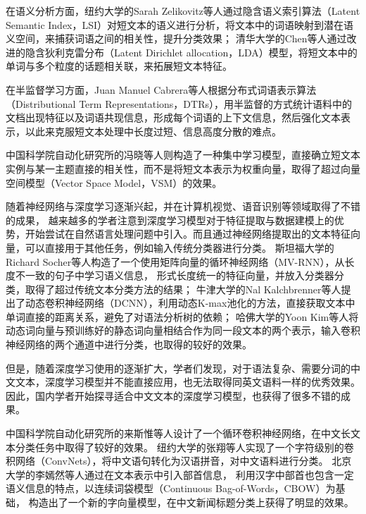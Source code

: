 在语义分析方面，纽约大学的Sarah Zelikovitz等人通过隐含语义索引算法（Latent Semantic Index，LSI）对短文本的语义进行分析，将文本中的词语映射到潜在语义空间，来捕获词语之间的相关性，提升分类效果；
清华大学的Chen等人通过改进的隐含狄利克雷分布（Latent Dirichlet allocation，LDA）模型，将短文本中的单词与多个粒度的话题相关联，来拓展短文本特征。

在半监督学习方面，Juan Manuel Cabrera等人根据分布式词语表示算法（Distributional Term Representations，DTRs），用半监督的方式统计语料中的文档出现特征以及词语共现信息，形成每个词语的上下文信息，然后强化文本表示，以此来克服短文本处理中长度过短、信息高度分散的难点。

中国科学院自动化研究所的冯晓等人则构造了一种集中学习模型，直接确立短文本实例与某一主题直接的相关性，而不是将短文本表示为权重向量，取得了超过向量空间模型（Vector Space Model，VSM）的效果。

随着神经网络与深度学习逐渐兴起，并在计算机视觉、语音识别等领域取得了不错的成果，
越来越多的学者注意到深度学习模型对于特征提取与数据建模上的优势，开始尝试在自然语言处理问题中引入。而且通过神经网络提取出的文本特征向量，可以直接用于其他任务，例如输入传统分类器进行分类。
斯坦福大学的Richard Socher等人构造了一个使用矩阵向量的循环神经网络（MV-RNN），从长度不一致的句子中学习语义信息，
形式长度统一的特征向量，并放入分类器分类，取得了超过传统文本分类方法的结果；
牛津大学的Nal Kalchbrenner等人提出了动态卷积神经网络（DCNN），利用动态K-max池化的方法，直接获取文本中单词直接的距离关系，避免了对语法分析树的依赖；
哈佛大学的Yoon Kim等人将动态词向量与预训练好的静态词向量相结合作为同一段文本的两个表示，输入卷积神经网络的两个通道中进行分类，也取得的较好的效果。

但是，随着深度学习使用的逐渐扩大，学者们发现，对于语法复杂、需要分词的中文文本，深度学习模型并不能直接应用，也无法取得同英文语料一样的优秀效果。因此，国内学者开始探寻适合中文文本的深度学习模型，也获得了很多不错的成果。

中国科学院自动化研究所的来斯惟等人设计了一个循环卷积神经网络，在中文长文本分类任务中取得了较好的效果。
纽约大学的张翔等人实现了一个字符级别的卷积网络（ConvNets），将中文语句转化为汉语拼音，对中文语料进行分类。
北京大学的李嫣然等人通过在文本表示中引入部首信息，
利用汉字中部首也包含一定语义信息的特点，以连续词袋模型（Continuous Bag-of-Words，CBOW）为基础，
构造出了一个新的字向量模型，在中文新闻标题分类上获得了明显的效果。


